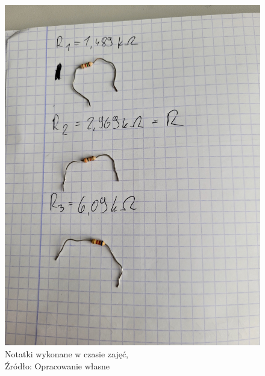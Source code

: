 \documentclass{article}
\begin{document}
\begin{figure}[!ht]
\begin{minipage}{.5\textwidth}
      \includegraphics[scale=0.06]{grafiki/notatki2.jpg}
      \caption{Notatki wykonane w czasie zajęć,
      \\Źródło: Opracowanie własne}
    \end{minipage}
  \end{figure}
\end{document}
